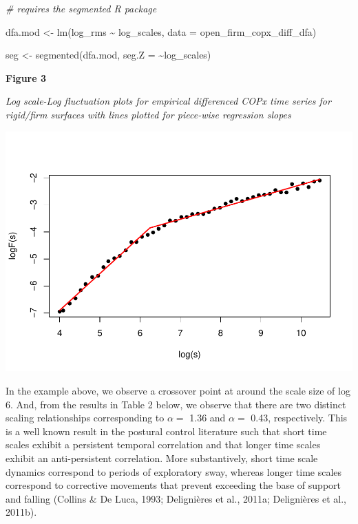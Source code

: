 \documentclass[
  man]{apa6}
\newenvironment{Shaded}{\begin{snugshade}}{\end{snugshade}}
\newcommand{\AttributeTok}[1]{\textcolor[rgb]{0.77,0.63,0.00}{#1}}
\newcommand{\CommentTok}[1]{\textcolor[rgb]{0.56,0.35,0.01}{\textit{#1}}}
\newcommand{\FunctionTok}[1]{\textcolor[rgb]{0.00,0.00,0.00}{#1}}
\newcommand{\NormalTok}[1]{#1}
\newcommand{\OtherTok}[1]{\textcolor[rgb]{0.56,0.35,0.01}{#1}}
\newcommand{\SpecialCharTok}[1]{\textcolor[rgb]{0.00,0.00,0.00}{#1}}
\begin{document}
\begin{Shaded}
\begin{Highlighting}[]
\CommentTok{\# requires the segmented R package}

\NormalTok{dfa.mod }\OtherTok{\textless{}{-}} \FunctionTok{lm}\NormalTok{(log\_rms }\SpecialCharTok{\textasciitilde{}}\NormalTok{ log\_scales, }\AttributeTok{data =}\NormalTok{ open\_firm\_copx\_diff\_dfa)}

\NormalTok{seg }\OtherTok{\textless{}{-}} \FunctionTok{segmented}\NormalTok{(dfa.mod, }\AttributeTok{seg.Z =} \SpecialCharTok{\textasciitilde{}}\NormalTok{log\_scales)}
\end{Highlighting}
\end{Shaded}

\textbf{Figure 3}

\emph{Log scale-Log fluctuation plots for empirical differenced COPx time
series for rigid/firm surfaces with lines plotted for piece-wise
regression slopes}

\includegraphics{fractal_regression_paper_brm_files/figure-latex/unnamed-chunk-7-1.pdf}

In the example above, we observe a crossover point at around the scale
size of log 6. And, from the results in Table 2 below, we observe that
there are two distinct scaling relationships corresponding to \(\alpha =\)
1.36 and \(\alpha =\) 0.43, respectively. This is a well known result in
the postural control literature such that short time scales exhibit a
persistent temporal correlation and that longer time scales exhibit an
anti-persistent correlation. More substantively, short time scale
dynamics correspond to periods of exploratory sway, whereas longer time
scales correspond to corrective movements that prevent exceeding the
base of support and falling (Collins \& De Luca, 1993; Delignières et al., 2011a; Delignières et al., 2011b).
\end{document}
